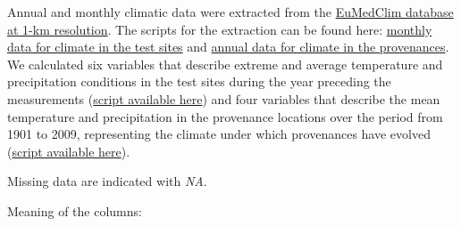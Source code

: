 \documentclass[]{article}
\begin{document}
Annual and monthly climatic data were extracted from the
\href{https://gentree.data.inra.fr/climate/}{EuMedClim database at 1-km
resolution}. The scripts for the extraction can be found here:
\href{https://github.com/JulietteArchambeau/HeightPinpinClonapin/blob/master/scripts/DataMunging/01_ExtractingMonthlyClimateEuMedClimData.R}{monthly
data for climate in the test sites} and
\href{https://github.com/JulietteArchambeau/HeightPinpinClonapin/blob/master/scripts/DataMunging/01_ExtractingAnnualClimateEuMedClimData.R}{annual
data for climate in the provenances}. We calculated six variables that
describe extreme and average temperature and precipitation conditions in
the test sites during the year preceding the measurements
(\href{https://github.com/JulietteArchambeau/HeightPinpinClonapin/blob/master/scripts/DataMunging/02_CalculatingSiteMonthlyClimaticVariables.R}{script
available here}) and four variables that describe the mean temperature
and precipitation in the provenance locations over the period from 1901
to 2009, representing the climate under which provenances have evolved
(\href{https://github.com/JulietteArchambeau/HeightPinpinClonapin/blob/master/scripts/DataMunging/02_CalculatingProvAnnualClimaticVariables.R}{script
available here}).

Missing data are indicated with \emph{NA}.

Meaning of the columns:
\end{document}
